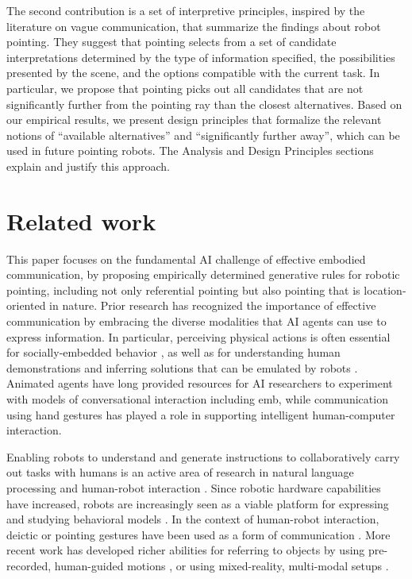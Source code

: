\documentclass[letterpaper]{article} %
\begin{document}
The second contribution is a set of interpretive principles, inspired by the literature on vague communication, that summarize the findings about robot pointing.  They suggest that pointing selects from a set of candidate interpretations determined by the type of information specified, the possibilities presented by the scene, and the options compatible with the current task.  In particular, we propose that pointing picks out all candidates that are not significantly further from the pointing ray than the closest alternatives.  Based on our empirical results, we present design principles that formalize the relevant notions of ``available alternatives'' and ``significantly further away'', which can be used in future pointing robots.  The Analysis and Design Principles sections explain and justify this approach.


\section{Related work}
\label{related-work}

This paper focuses on the fundamental AI challenge of effective embodied communication, by proposing empirically determined generative rules for robotic pointing, including not only referential pointing but also pointing that is location-oriented in nature. Prior research has recognized the importance of effective communication by embracing the diverse modalities that AI agents can use to express information. In particular, perceiving physical actions \cite{thibadeau1986artificial} is often essential for socially-embedded behavior \cite{dautenhahn2002embodied}, as well as for understanding human demonstrations and inferring solutions that can be emulated by robots \cite{kuniyoshi1994learning}. Animated agents have long provided resources for AI researchers to experiment with models of conversational interaction including emb\cite{cassell:siggraph1994}, while communication using hand gestures \cite{pavlovic1997visual} has played a role in supporting intelligent human-computer interaction. 

Enabling robots to understand and generate instructions to collaboratively carry out tasks with humans is an active area of research in natural language processing and human-robot interaction \cite{butepage2017human,cha2018survey}. Since robotic hardware capabilities have increased, robots are increasingly seen as a viable platform for expressing and studying behavioral models \cite{scassellati2000investigating}.  In the context of human-robot interaction, deictic or pointing gestures have been used as a form of communication \cite{pook1996deictic}.  More recent work has developed richer abilities for referring to objects by using pre-recorded, human-guided motions \cite{sauppe2014robot}, or using mixed-reality, multi-modal setups \cite{williams2019mixed}. 
\end{document}

